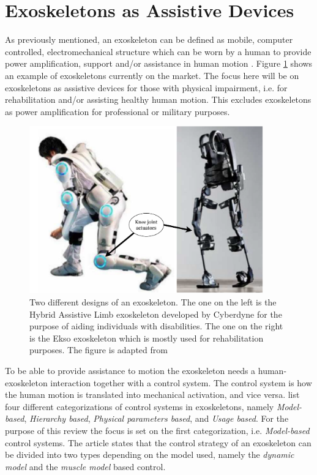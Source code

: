\documentclass[../main.tex]{subfiles}
\begin{document}

\section{Exoskeletons as Assistive Devices}
\label{sec:A-Exoskeletons}
As previously mentioned, an exoskeleton can be defined as mobile, computer controlled, electromechanical structure which can be worn by a human to provide power amplification, support and/or assistance in human motion \cite{Anam2012, Gorgey2018}.
Figure \ref{fig:exoskeleton} shows an example of exoskeletons currently on the market.
The focus here will be on exoskeletons as assistive devices for those with physical impairment, i.e. for rehabilitation and/or assisting healthy human motion. 
This excludes exoskeletons as power amplification for professional or military purposes.
\begin{figure}[ht]
    \centering
    \includegraphics[width=0.9\textwidth]{img/exoskeleton_fig}
    \caption{Two different designs of an exoskeleton. The one on the left is the Hybrid Assistive Limb exoskeleton developed by Cyberdyne for the purpose of aiding individuals with disabilities. The one on the right is the Ekso exoskeleton which is mostly used for rehabilitation purposes. The figure is adapted from \cite[Fig. 3]{Young2017}}
    \label{fig:exoskeleton}
\end{figure}
To be able to provide assistance to motion the exoskeleton needs a human-exoskeleton interaction together with a control system.
The control system is how the human motion is translated into mechanical activation, and vice versa. 
\textcite{Anam2012} list four different categorizations of control systems in exoskeletons, namely \textit{Model-based}, \textit{Hierarchy based}, \textit{Physical parameters based}, and \textit{Usage based}. 
For the purpose of this review the focus is set on the first categorization, i.e. \textit{Model-based} control systems.
The article states that the control strategy of an exoskeleton can be divided into two types depending on the model used, namely the \textit{dynamic model} and the \textit{muscle model} based control. 
\end{document}
